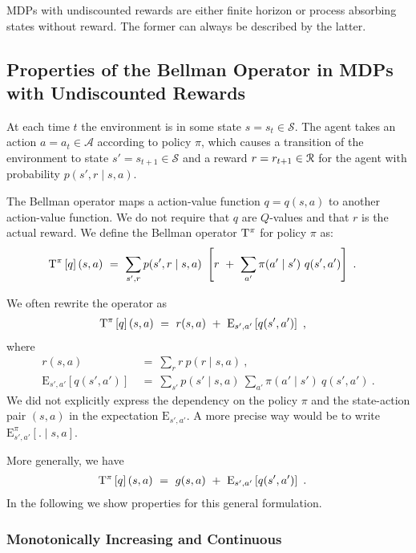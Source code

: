 \documentclass{article}
\newcommand{\cA}{\mathcal{A}} \newcommand{\cB}{\mathcal{B}}
\newcommand{\cS}{\mathcal{S}} \newcommand{\cT}{\mathcal{T}}
\newcommand\EXP{\mathbf{\mathrm{E}}}
\begin{document}
\begin{appendices}
MDPs with undiscounted rewards are either finite horizon or process absorbing 
states without reward. The former can always be described by the latter.


\subsection{Properties of the Bellman Operator in MDPs with Undiscounted Rewards}
\label{sec:ApropPoly}

At each time $t$ the environment is in some state $s=s_t \in \cS$. The agent
takes an action $a=a_t \in \cA$ according to policy $\pi$, which causes a transition of
the environment to state $s'=s_{t+1} \in \cS$
and a reward $r=r_{t+1} \in \mathcal{R}$ for the agent
with probability $p(s',r\mid s,a)$.


The Bellman operator maps a action-value function $q=q(s,a)$ to another
action-value function. We do not require that $q$ are $Q$-values and
that $r$ is the actual reward. 
We define the Bellman operator $\mathrm{T}^\pi$ for policy $\pi$ as:
\begin{align}
  \rT^\pi \left[ q \right] (s,a)   \ &= \ \sum_{s',r} p(s',r\mid s,a) \ 
  \left[r \ + \ \sum_{a'} \pi(a' \mid s') \ q(s',a')  \right] \ .
\end{align} 

We often rewrite the operator as
\begin{align}
  \rT^\pi \left[ q \right] (s,a)   \ &= \ r(s,a)
\ + \ \EXP_{s',a'} \left[q(s',a')  \right] \ ,
\end{align} 
where
\begin{align}
  r(s,a) \ &=  \
  \sum_{r} r \ p(r\mid s,a) \ , \\ 
  \EXP_{s',a'} \left[q(s',a')  \right] \ &= \
  \sum_{s'} p(s'\mid s,a) \ \sum_{a'} \pi(a' \mid s') \ q(s',a') \ . 
\end{align} 
We did not explicitly express the dependency on the policy $\pi$ and
the state-action pair $(s,a)$ in the
expectation $\EXP_{s',a'}$. A more precise way would be to write
$\EXP^\pi_{s',a'}\left[ . \mid s,a \right]$.


More generally, we have
\begin{align}
\label{eq:bellGen}
  \rT^\pi \left[ q \right] (s,a)   \ &= \ g(s,a)
 \ + \ \EXP_{s',a'} \left[q(s',a')  \right] \ .
\end{align} 
In the following we show properties for this general formulation.

\subsubsection{Monotonically Increasing and Continuous}
\label{sec:ApropPolyFP}


\end{appendices}
\end{document}

